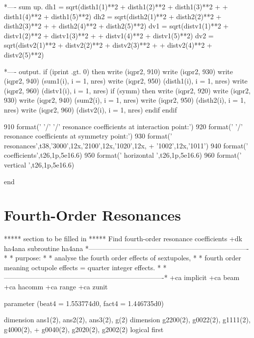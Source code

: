 *---- sum up.
      dh1 = sqrt(disth1(1)**2 + disth1(2)**2 + disth1(3)**2 +
     +           disth1(4)**2 + disth1(5)**2)
      dh2 = sqrt(disth2(1)**2 + disth2(2)**2 + disth2(3)**2 +
     +           disth2(4)**2 + disth2(5)**2)
      dv1 = sqrt(distv1(1)**2 + distv1(2)**2 + distv1(3)**2 +
     +           distv1(4)**2 + distv1(5)**2)
      dv2 = sqrt(distv2(1)**2 + distv2(2)**2 + distv2(3)**2 +
     +           distv2(4)**2 + distv2(5)**2)
 
*---- output.
      if (iprint .gt. 0) then
        write (iqpr2, 910)
        write (iqpr2, 930)
        write (iqpr2, 940) (sum1(i), i = 1, nres)
        write (iqpr2, 950) (disth1(i), i = 1, nres)
        write (iqpr2, 960) (distv1(i), i = 1, nres)
        if (symm) then
          write (iqpr2, 920)
          write (iqpr2, 930)
          write (iqpr2, 940) (sum2(i), i = 1, nres)
          write (iqpr2, 950) (disth2(i), i = 1, nres)
          write (iqpr2, 960) (distv2(i), i = 1, nres)
        endif
      endif
 
  910 format(' '/' '/' resonance coefficients at interaction point:')
  920 format(' '/' resonance coefficients at symmetry point:')
  930 format(' resonances',t38,'3000',12x,'2100',12x,'1020',12x,
     +                         '1002',12x,'1011')
  940 format(' coefficients',t26,1p,5e16.6)
  950 format(' horizontal  ',t26,1p,5e16.6)
  960 format(' vertical    ',t26,1p,5e16.6)
 
      end
\fi
 
 
\section{Fourth-Order Resonances}
***** section to be filled in *****
Find fourth-order resonance coefficients
\iffalse
+dk ha4ana
      subroutine ha4ana
*----------------------------------------------------------------------*
* purpose:                                                             *
*   analyse the fourth order effects of sextupoles,                    *
*   fourth order meaning octupole effects = quarter integer effects.   *
*----------------------------------------------------------------------*
+ca implicit
+ca beam
+ca hacomm
+ca range
+ca zunit
 
      parameter         (beat4 = 1.553774d0, fact4 = 1.446735d0)
 
      dimension         ans1(2),  ans2(2),  ans3(2),  g(2)
      dimension         g2200(2), g0022(2), g1111(2), g4000(2),
     +                  g0040(2), g2020(2), g2002(2)
      logical first
 
